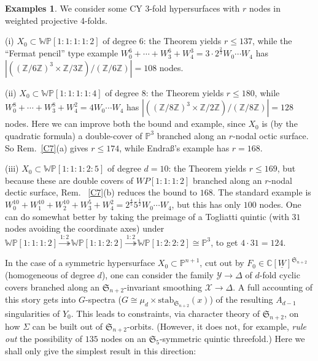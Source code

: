 \documentclass[12pt,letterpaper,english]{amsart}
\numberwithin{equation}{section}
\numberwithin{figure}{section}
\theoremstyle{plain}
\theoremstyle{remark}
\theoremstyle{definition}
\theoremstyle{definition}
\theoremstyle{plain}
\theoremstyle{plain}
\theoremstyle{plain}
\theoremstyle{plain}
\theoremstyle{definition}
\newtheorem{exs}[equation]{Examples}
\def\CC{\mathbb{C}}
\def\ZZ{\mathbb{Z}}
\def\PP{\mathbb{P}}
\def\Y{\mathcal{Y}}
\def\X{\mathcal{X}}
\def\Y{\mathcal{Y}}
\def\WP{\mathbb{WP}}
\def\UW{\underline{W}}
\theoremstyle{definition}
\begin{document}
\begin{exs}\label{C8}
We consider some CY 3-fold hypersurfaces with $r$ nodes in weighted projective 4-folds.

(i) $X_0\subset \WP[1{:}1{:}1{:}1{:}2]$ of degree $6$: the Theorem yields $r\leq 137$, while the ``Fermat pencil'' type example $W_0^6+\cdots +W_3^6+W_4^3=3\cdot 2^{\frac{2}{3}}W_0\cdots W_4$ has $|((\ZZ/6\ZZ)^3\times \ZZ/3\ZZ)/(\ZZ/6\ZZ)|=108$ nodes.

(ii) $X_0\subset \WP[1{:}1{:}1{:}1{:}4]$ of degree $8$: the Theorem yields $r\leq 180$, while $W_0^8+\cdots +W_3^8+W_4^2=4W_0\cdots W_4$ has $|((\ZZ/8\ZZ)^3\times \ZZ/2\ZZ)/(\ZZ/8\ZZ)|=128$ nodes. Here we can improve both the bound and example, since $X_0$ is (by the quadratic formula) a double-cover of $\PP^3$ branched along an $r$-nodal octic surface. So Rem.~\ref{C7}(a) gives $r\leq 174$, while Endra\ss's example \cite{En} has $r=168$.

(iii) $X_0\subset \WP[1{:}1{:}1{:}2{:}5]$ of degree $d=10$: the Theorem yields $r\leq 169$, but because these are double covers of $WP[1{:}1{:}1{:}2]$ branched along an $r$-nodal dectic surface, Rem.~ \ref{C7}(b) reduces the bound to $168$. The standard example is $W_0^{10}+W_1^{10}+W_2^{10}+W_3^5+W_4^2=2^{\frac{4}{5}}5^{\frac{1}{2}}W_0\cdots W_4$, but this has only $100$ nodes. One can do somewhat better by taking the preimage of a Togliatti quintic \cite{Be} (with $31$ nodes avoiding the coordinate axes) under $\WP[1{:}1{:}1{:}2]\overset{1{:}2}{\twoheadrightarrow}\WP[1{:}1{:}2{:}2]\overset{1{:}2}{\twoheadrightarrow}\WP[1{:}2{:}2{:}2]\cong\PP^3$, to get $4\cdot 31=124$.
\end{exs}

In the case of a symmetric hypersurface $X_0\subset \PP^{n+1}$, cut out by $F_0\in \CC[\UW]^{\mathfrak{S}_{n+2}}$ (homogeneous of degree $d$), one can consider the family $\Y\to \Delta$ of $d$-fold cyclic covers branched along an $\mathfrak{S}_{n+2}$-invariant smoothing $\X\to \Delta$. A full accounting of this story gets into $G$-spectra ($G\cong \mu_d\times\mathrm{stab}_{\mathfrak{S}_{n+2}}(x)$) of the resulting $A_{d-1}$ singularities of $Y_0$. This leads to constraints, via character theory of $\mathfrak{S}_{n+2}$, on how $\Sigma$ can be built out of $\mathfrak{S}_{n+2}$-orbits. (However, it does not, for example, \emph{rule out} the possibility of $135$ nodes on an $\mathfrak{S}_{5}$-symmetric quintic threefold.) Here we shall only give the simplest result in this direction:
\end{document}
